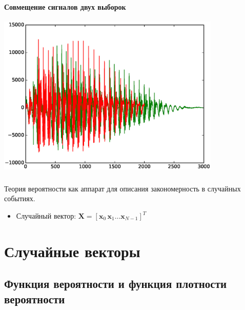 \documentclass{beamer}
\begin{document}
\begin{frame}
  \frametitle{\insertsection}
  \framesubtitle{Совмещение сигналов двух выборок}
  \includegraphics[width=0.8\textwidth]{a1a2.eps}
\end{frame}

\begin{frame}
  \frametitle{\insertsection}
  \framesubtitle{\insertsubsection}

  \begin{center}
  Теория вероятности как аппарат для описания закономерность в случайных событиях.
  \end{center} \pause
  \begin{itemize}
  \item Случайный вектор: $ \mathbf{X} = [\mathbf{x}_0\, \mathbf{x}_1 \ldots \mathbf{x}_{N - 1}]^T $
  \end{itemize}

\end{frame}

\section{Случайные векторы}
\subsection{Функция вероятности и функция плотности вероятности}
\end{document}
